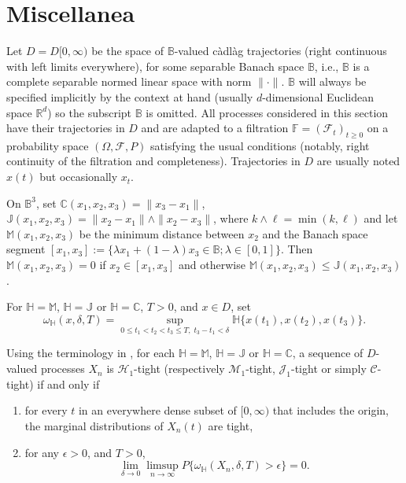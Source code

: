 \documentclass[final]{amsart}
\theoremstyle{definition}
\numberwithin{equation}{section}
\newcommand{\dB}{\ensuremath{\mathbb{B}}}
\newcommand{\dC}{\ensuremath{\mathbb{C}}}
\newcommand{\dF}{\ensuremath{\mathbb{F}}}
\newcommand{\dH}{\ensuremath{\mathbb{H}}}
\newcommand{\dJ}{\ensuremath{\mathbb{J}}}
\newcommand{\dM}{\ensuremath{\mathbb{M}}}
\newcommand{\dR}{\ensuremath{\mathbb{R}}}
\newcommand{\cF}{\ensuremath{\mathcal{F}}}
\begin{document}


\appendix

\section{Miscellanea}\label{app:remvail}

Let $D= D[0,\infty)$ be the space of $\dB$-valued c\`adl\`ag trajectories (right continuous with left limits everywhere), for some separable Banach space $\dB$, i.e., $\dB$ is a complete separable normed linear space with norm $\|\cdot\|$.
$\dB$ will always be specified implicitly by the context at hand (usually $d$-dimensional Euclidean space $\dR^d$)
so the subscript $\dB$ is omitted. All processes considered in this section have their trajectories in $D$
and are adapted to a filtration $\dF = (\cF_t)_{t\ge 0}$ on a probability space
$(\Omega,\cF,P)$ satisfying the usual conditions (notably, right continuity of the filtration and completeness).
Trajectories in $D$ are usually noted $x(t)$ but occasionally $x_t$.

On $\dB^3$, set $\dC(x_1,x_2,x_3)=\|x_3-x_1\|$, $\dJ(x_1,x_2,x_3) = \|x_2-x_1\|\wedge \|x_2-x_3\|$, where $k\wedge\ell = \min(k,\ell)$
and let $\dM(x_1,x_2,x_3)$ be the minimum distance between
$x_2$ and the Banach space segment $[x_1,x_3]:=\{\lambda x_1+(1-\lambda)x_3\in \dB; \lambda\in[0,1]\}$. Then
$\dM(x_1,x_2,x_3) = 0 $ if $x_2 \in [x_1,x_3]$ and otherwise $\dM(x_1,x_2,x_3) \le \dJ(x_1,x_2,x_3)$.

For $\dH=\dM$, $\dH=\dJ$ or $\dH=\dC$, $T>0$, and $x \in D$, set
$$
\omega_\dH(x,\delta,T) = \sup_{0 \le t_1 < t_2 < t_3\le T, \; t_3-t_1<\delta}
\dH\{x(t_1),x(t_2),x(t_3)\}.
$$

Using the terminology in \citet[Theorem 3.2.2]{Skorohod:1956}, for each $\dH=\dM$, $\dH=\dJ$ or $\dH=\dC$,
a sequence of $D$-valued processes $X_n$ is $\mathcal{H}_1$-tight (respectively $\mathcal{M}_1$-tight,
$\mathcal{J}_1$-tight or simply $\mathcal{C}$-tight) if and only if
\begin{enumerate}
\item[(i)]
for every $t$ in an everywhere dense subset of $[0,\infty)$ that includes the origin, the marginal distributions of $X_n(t)$ are tight,

\item[(ii)]
 for any $\epsilon>0$, and $T>0$,
\begin{equation}\label{eq:modulus2}
\lim_{\delta\to 0}\limsup_{n\to\infty}P\{\omega_\dH(X_n,\delta,T) > \epsilon\}=0.
\end{equation}
\end{enumerate}
\end{document}

